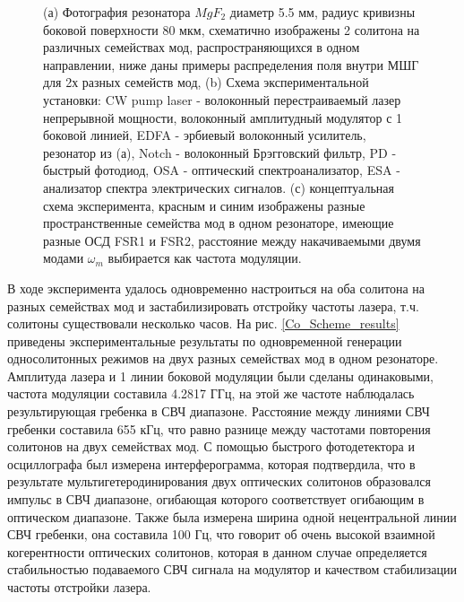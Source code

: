 \begin{figure}[ht]
\begin{minipage}[ht]{1\linewidth}
\end{minipage}
\caption{(а) Фотография резонатора $MgF_2$ диаметр 5.5 мм, радиус кривизны боковой поверхности 80 мкм, схематично изображены 2 солитона на различных семействах мод, распространяющихся в одном направлении, ниже даны примеры распределения поля внутри МШГ для 2х разных семейств мод, (b) Схема экспериментальной установки: CW pump laser - волоконный перестраиваемый лазер непрерывной мощности, волоконный амплитудный модулятор с 1 боковой линией, EDFA - эрбиевый волоконный усилитель, резонатор из (а), Notch - волоконный Брэгговский фильтр, PD - быстрый фотодиод, OSA - оптический спектроанализатор, ESA - анализатор спектра электрических сигналов. (с) концептуальная схема эксперимента, красным и синим изображены разные пространственные семейства мод в одном резонаторе, имеющие разные ОСД FSR1 и FSR2, расстояние между накачиваемыми двумя модами $\omega_m$ выбирается как частота модуляции.}
\label{Figure1_V1_c}
\end{figure}

\begin{figure}[ht]
\begin{minipage}[ht]{1\linewidth}
\end{minipage}
\caption{}
\label{Figure2}
\end{figure}

В ходе эксперимента удалось одновременно настроиться на оба солитона на разных семействах мод и застабилизировать отстройку частоты лазера, т.ч. солитоны существовали несколько часов. На рис. \ref{Co_Scheme_results} приведены экспериментальные результаты по одновременной генерации односолитонных режимов на двух разных семействах мод в одном резонаторе. Амплитуда лазера и 1 линии боковой модуляции были сделаны одинаковыми, частота модуляции составила 4.2817 ГГц, на этой же частоте наблюдалась результирующая гребенка в СВЧ диапазоне. Расстояние между линиями СВЧ гребенки составила 655 кГц, что равно разнице между частотами повторения солитонов на двух семействах мод. С помощью быстрого фотодетектора и осциллографа был измерена интерферограмма, которая подтвердила, что в результате мультигетеродинирования двух оптических солитонов образовался импульс в СВЧ диапазоне, огибающая которого соответствует огибающим в оптическом диапазоне. Также была измерена ширина одной нецентральной линии СВЧ гребенки, она составила 100 Гц, что говорит об очень высокой взаимной когерентности оптических солитонов, которая в данном случае определяется стабильностью подаваемого СВЧ сигнала на модулятор и качеством стабилизации частоты отстройки лазера. 

